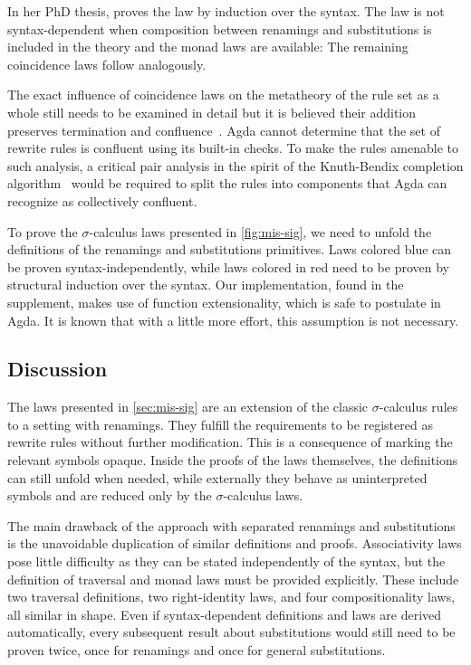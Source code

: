 \documentclass[screen,nonacm]{acmart}
\begin{document}
In her PhD thesis, \citet{Stark:2020:Mechanising} proves the
 law by induction over the syntax. The law is not
syntax-dependent when composition between renamings and substitutions is
included in the theory and the monad laws are available: \ECoincidenceProof{}
The remaining coincidence laws follow analogously.

The exact influence of coincidence laws on the metatheory of the rule set as a
whole still needs to be examined in detail but it is believed their addition
preserves termination and confluence~\cite{10.1145/3293880.3294101}. Agda
cannot determine that the set of rewrite rules is confluent using its built-in
checks. To make the rules amenable to such analysis, a critical pair analysis
in the spirit of the Knuth-Bendix completion algorithm~\cite{Knuth1983} would
be required to split the rules into components that Agda can recognize as
collectively confluent.

To prove the $σ$-calculus laws presented in \cref{fig:mis-sig}, we need to
unfold the definitions of the renamings and substitutions primitives. Laws
colored blue can be proven syntax-independently, while laws colored in red need
to be proven by structural induction over the syntax. Our implementation, found
in the supplement, makes use of function extensionality, which is safe to
postulate in Agda. It is known that with a little more effort, this assumption
is not necessary.

\subsection{Discussion}\label{sec:mis-dis}
The laws presented in \cref{sec:mis-sig} are an extension of the classic
$σ$-calculus rules to a setting with renamings. They fulfill the requirements
to be registered as rewrite rules without further modification. This is a
consequence of marking the relevant symbols opaque. Inside the proofs of the
laws themselves, the definitions can still unfold when needed, while externally
they behave as uninterpreted symbols and are reduced only by the $σ$-calculus
laws.

The main drawback of the approach with separated renamings and substitutions is
the unavoidable duplication of similar definitions and proofs. Associativity
laws pose little difficulty as they can be stated independently of the syntax,
but the definition of traversal and monad laws must be provided explicitly.
These include two traversal definitions, two right-identity laws, and four
compositionality laws, all similar in shape. Even if syntax-dependent
definitions and laws are derived automatically, every subsequent result about
substitutions would still need to be proven twice, once for renamings and once
for general substitutions.
\end{document}
